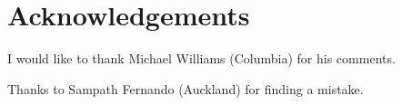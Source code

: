 \chapter{Acknowledgements}
I would like to thank Michael Williams (Columbia) for his comments.

Thanks to Sampath Fernando (Auckland) for finding a mistake.

